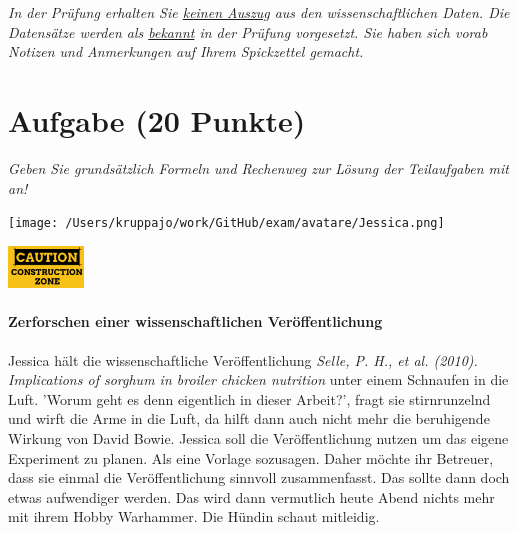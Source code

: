 \documentclass[a4paper, 9pt]{scrartcl}\usepackage[]{graphicx}\usepackage[]{xcolor}
\begin{document}
\textit{In der Prüfung erhalten Sie \underline{keinen Auszug} aus den wissenschaftlichen Daten. Die Datensätze werden als \underline{bekannt} in der Prüfung vorgesetzt. Sie haben sich vorab Notizen und Anmerkungen auf Ihrem Spickzettel gemacht.}


\clearpage

\section{Aufgabe \hfill (20 Punkte)}

\textit{Geben Sie grundsätzlich Formeln und Rechenweg zur Lösung der Teilaufgaben mit an!} \\[1Ex]
 

 
\begin{minipage}[t]{0.5\textwidth}
\texttt{[image: /Users/kruppajo/work/GitHub/exam/avatare/Jessica.png]}
\end{minipage}
\begin{minipage}[t]{0.5\textwidth}
\hfill
\href{https://youtu.be/C9skfFRTHhI}{\includegraphics[width = 2cm]{img/caution}}
\end{minipage}



\paragraph{Zerforschen einer wissenschaftlichen Veröffentlichung}

Jessica hält die wissenschaftliche Veröffentlichung \textit{Selle, P. H., et al. (2010). Implications of sorghum in broiler chicken nutrition} unter einem Schnaufen in die Luft. 'Worum geht es denn eigentlich in dieser Arbeit?', fragt sie stirnrunzelnd und wirft die Arme in die Luft, da hilft dann auch nicht mehr die beruhigende Wirkung von David Bowie. Jessica soll die Veröffentlichung nutzen um das eigene Experiment zu planen. Als eine Vorlage sozusagen. Daher möchte ihr Betreuer, dass sie einmal die Veröffentlichung sinnvoll zusammenfasst. Das sollte dann doch etwas aufwendiger werden. Das wird dann vermutlich heute Abend nichts mehr mit ihrem Hobby Warhammer. Die Hündin schaut mitleidig.\\
\end{document}
